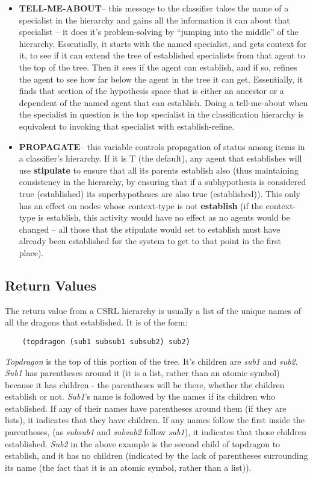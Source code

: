 \begin{itemize}
\item {\bf TELL-ME-ABOUT}-- this message to the classifier takes the
name of a specialist in the hierarchy and gains all the information it
can about that specialist -- it does it's problem-solving by ``jumping
into the middle'' of the hierarchy. Essentially, it starts with the
named specialist, and gets context for it, to see if it can extend the
tree of established specialists from that agent to the top of the
tree. Then it sees if the agent can establish, and if so, refines the
agent to see how far below the agent in the tree it can get.
Essentially, it finds that section of the hypothesis space that is
either an ancestor or a dependent of the named agent that can
establish. Doing a tell-me-about when the specialist in question is
the top specialist in the classification hierarchy is equivalent to
invoking that specialist with establish-refine.

\item {\bf PROPAGATE}-- this variable controls propagation of status
among items in a classifier's hierarchy. If it is T (the default),
any agent that establishes will use {\bf stipulate} to ensure that
all its parents establish also (thus maintaining consistency in the
hierarchy, by ensuring that if a subhypothesis is considered true
(established) its superhypotheses are also true (established)). This
only has an effect on nodes whose context-type is not {\bf establish}
(if the context-type is establish, this activity would have no effect
as no agents would be changed -- all those that the stipulate would
set to establish must have already been established for the system
to get to that point in the first place).
\end{itemize}



\subsection{Return Values\label{return values}}

	The return value from a CSRL hierarchy is usually a list of
the unique names of all the dragons that established. It is of
the form:
\begin{verbatim}
	(topdragon (sub1 subsub1 subsub2) sub2)
\end{verbatim}

{\it Topdragon} is the top of this portion of the tree. It's children
are {\it sub1} and {\it sub2\/}. {\it Sub1} has parentheses around it
(it is a list, rather than an atomic symbol) because it has children -
the parentheses will be there, whether the children establish or not.
{\it Sub1\/}'s name is followed by the names if its children who
established.  If any of their names have parentheses around them (if they
are lists), it indicates that they have children. If any names follow
the first inside the parentheses, (as {\it subsub1} and {\it subsub2}
follow {\it sub1\/}), it indicates that those children established.
{\it Sub2} in the above example is the second child of topdragon to
establish, and it has no children (indicated by the lack of parentheses
surrounding its name (the fact that it is an atomic symbol, rather
than a list)).



